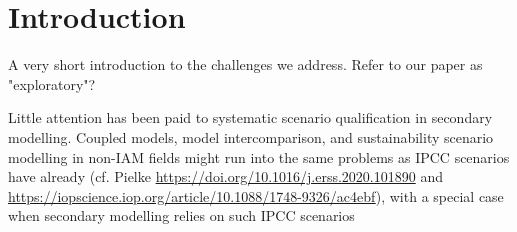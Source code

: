 \documentclass{article}
\begin{document}
\label{intro}

\section{Introduction}
A very short introduction to the challenges we address. 
Refer to our paper as "exploratory"?

Little attention has been paid to systematic scenario qualification in secondary modelling.
Coupled models, model intercomparison, and sustainability scenario modelling in non-IAM fields might run into the same problems as IPCC scenarios have already (cf. Pielke \url{https://doi.org/10.1016/j.erss.2020.101890} and \url{https://iopscience.iop.org/article/10.1088/1748-9326/ac4ebf}), with a special case when secondary modelling relies on such IPCC scenarios
\end{document}
